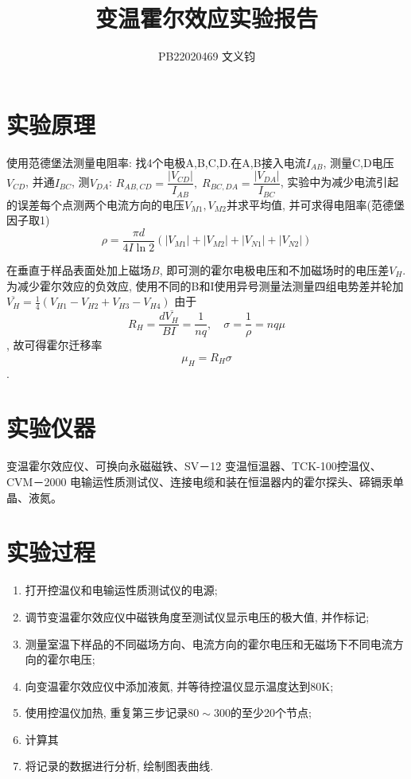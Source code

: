 \documentclass[UTF8]{ctexart}
\title{变温霍尔效应实验报告}
\author{PB22020469 文义钧}
\begin{document}
\maketitle

\section{实验原理}
使用范德堡法测量电阻率: 找4个电极A,B,C,D.在A,B接入电流$I_{AB}$, 测量C,D电压$V_{CD}$, 并通$I_{BC}$, 测$V_{DA}$:
$R_{AB,CD}=\dfrac{|V_{CD}|}{I_{AB}},\;R_{BC,DA}=\dfrac{|V_{DA}|}{I_{BC}}$, 
实验中为减少电流引起的误差每个点测两个电流方向的电压$V_{M1}, V_{M2}$并求平均值, 并可求得电阻率(范德堡因子取1)$$\rho=\dfrac{\pi d}{4I\ln 2}(|V_{M1}|+|V_{M2}|+|V_{N1}|+|V_{N2}|)$$\par
在垂直于样品表面处加上磁场$B$, 即可测的霍尔电极电压和不加磁场时的电压差$V_{H}$. 为减少霍尔效应的负效应, 使用不同的B和I使用异号测量法测量四组电势差并轮加$\overline{V_H}=\frac14(V_{H1}-V_{H2}+V_{H3}-V_{H4})$
由于$$R_{H}=\dfrac{d \overline{V_{H}}}{BI}=\dfrac1{nq},\quad\sigma=\dfrac1\rho=nq\mu$$, 故可得霍尔迁移率$$\mu_{H}=R_{H}\sigma$$.
\section{实验仪器}
变温霍尔效应仪、可换向永磁磁铁、SV－12 变温恒温器、TCK-100控温仪、
CVM－2000 电输运性质测试仪、连接电缆和装在恒温器内的霍尔探头、碲镉汞单晶、液氮。
\section{实验过程}
\begin{enumerate}
    \item 打开控温仪和电输运性质测试仪的电源;
    \item 调节变温霍尔效应仪中磁铁角度至测试仪显示电压的极大值, 并作标记;
    \item 测量室温下样品的不同磁场方向、电流方向的霍尔电压和无磁场下不同电流方向的霍尔电压;
    \item 向变温霍尔效应仪中添加液氮, 并等待控温仪显示温度达到80K;
    \item 使用控温仪加热, 重复第三步记录$80\sim300$的至少20个节点;
    \item 计算其
    \item 将记录的数据进行分析, 绘制图表曲线.
\end{enumerate}
\end{document}
